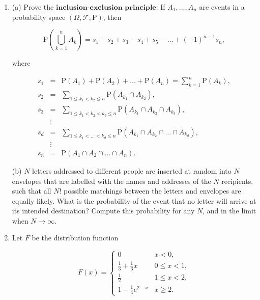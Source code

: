 \documentclass[11pt]{report}
\providecommand{\cal}{\mathcal}
\theoremstyle{plain}
\theoremstyle{definition}
\begin{document}
\begin{enumerate}[label=\arabic*.]
Prove that exponential random variables have the lack of memory property.

(d) Prove that any non-negative random variable that has the lack of memory property has the exponential distribution with some parameter $\lambda>0$. (This is easier if one assumes that the function $G(x)=\mathrm{P}(X\ge x)$ is differentiable on $[0,\infty)$, so you can make this assumption if you fail to find a more general argument).
\item (a) Prove the $\textbf{inclusion-exclusion principle}$: If $A_1,\ldots,A_n$ are events in a probability space $(\Omega, {\cal F}, \mathrm{P})$, then

\[
\mathrm{P}\left(\bigcup_{k=1}^n A_k\right) = s_1 - s_2 + s_3 - s_4 + s_5 - \ldots + (-1)^{n-1} s_n,
\]

where

\begin{eqnarray*}
s_1 &=& \mathrm{P}(A_1) + \mathrm{P}(A_2) + \ldots + \mathrm{P}(A_n) = \sum_{k=1}^n \mathrm{P}(A_k), \\
s_2 &=& \sum_{1\le k_1 < k_2 \le n} \mathrm{P}(A_{k_1} \cap A_{k_2}), \\
s_3 &=& \sum_{1\le k_1 < k_2 < k_3 \le n} \mathrm{P}(A_{k_1} \cap A_{k_2} \cap A_{k_3}), \\
& \vdots &  \\
s_d &=& \sum_{1\le k_1 < \ldots< k_d \le n} \mathrm{P}(A_{k_1} \cap A_{k_2} \cap \ldots \cap A_{k_d}), \\
& \vdots &\\
s_n &=& \mathrm{P}(A_1 \cap A_2 \cap \ldots \cap A_n).
\end{eqnarray*}

(b) $N$ letters addressed to different people are inserted at random into $N$ envelopes that are labelled with the names and addresses of the $N$ recipients, such that all $N!$ possible matchings between the letters and envelopes are equally likely. What is the probability of the event that no letter will arrive at its intended destination? Compute this probability for any $N$, and in the limit when $N\to\infty$.
\item Let $F$ be the distribution function

\[
F(x) = \begin{cases}
0 & x < 0, \\
\frac13 + \frac16 x & 0\le x < 1, \\
\frac12 & 1\le x < 2, \\
1-\frac14e^{2-x} & x\ge 2.
\end{cases}
\]


\end{enumerate}
\end{document}
